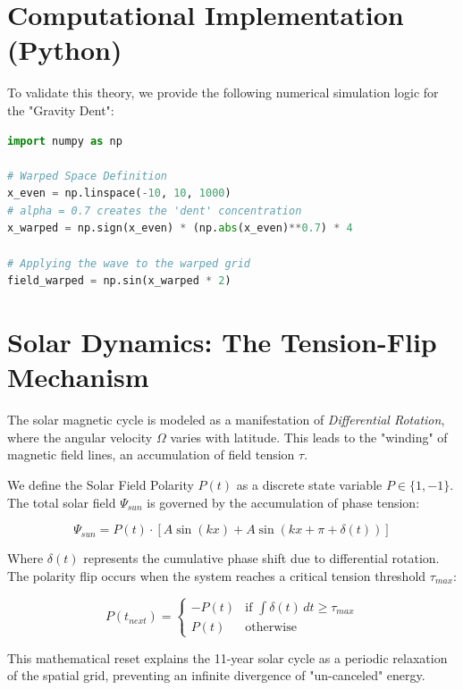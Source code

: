 \documentclass[11pt]{article}
\begin{document}
\section{Computational Implementation (Python)}
To validate this theory, we provide the following numerical simulation logic for the "Gravity Dent":

\begin{lstlisting}[language=Python, caption=Gravity Grid Deformation Model, basicstyle=\small\ttfamily, frame=single]
import numpy as np

# Warped Space Definition
x_even = np.linspace(-10, 10, 1000)
# alpha = 0.7 creates the 'dent' concentration
x_warped = np.sign(x_even) * (np.abs(x_even)**0.7) * 4 

# Applying the wave to the warped grid
field_warped = np.sin(x_warped * 2)
\end{lstlisting}

\section{Solar Dynamics: The Tension-Flip Mechanism}
The solar magnetic cycle is modeled as a manifestation of \textit{Differential Rotation}, where the angular velocity $\Omega$ varies with latitude. This leads to the "winding" of magnetic field lines, an accumulation of field tension $\tau$.

We define the Solar Field Polarity $P(t)$ as a discrete state variable $P \in \{1, -1\}$. The total solar field $\Psi_{sun}$ is governed by the accumulation of phase tension:

\begin{equation}
\Psi_{sun} = P(t) \cdot [A \sin(kx) + A \sin(kx + \pi + \delta(t))]
\end{equation}

Where $\delta(t)$ represents the cumulative phase shift due to differential rotation. The polarity flip occurs when the system reaches a critical tension threshold $\tau_{max}$:

\begin{equation}
P(t_{next}) = 
\begin{cases} 
-P(t) & \text{if } \int \delta(t) \, dt \geq \tau_{max} \\
P(t) & \text{otherwise}
\end{cases}
\end{equation}

This mathematical reset explains the 11-year solar cycle as a periodic relaxation of the spatial grid, preventing an infinite divergence of "un-canceled" energy.
\end{document}
